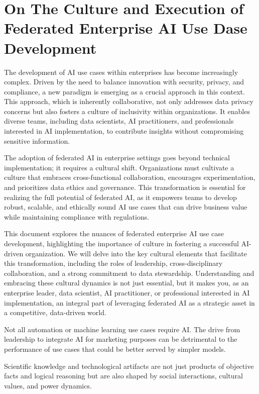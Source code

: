 \section{On The Culture and Execution of Federated Enterprise AI Use
Dase
Development}\label{on-the-culture-and-execution-of-federated-enterprise-ai-use-dase-development}

The development of AI use cases within enterprises has become
increasingly complex. Driven by the need to balance innovation with
security, privacy, and compliance, a new paradigm is emerging as a
crucial approach in this context. This approach, which is inherently
collaborative, not only addresses data privacy concerns but also fosters
a culture of inclusivity within organizations. It enables diverse teams,
including data scientists, AI practitioners, and professionals
interested in AI implementation, to contribute insights without
compromising sensitive information.

The adoption of federated AI in enterprise settings goes beyond
technical implementation; it requires a cultural shift. Organizations
must cultivate a culture that embraces cross-functional collaboration,
encourages experimentation, and prioritizes data ethics and governance.
This transformation is essential for realizing the full potential of
federated AI, as it empowers teams to develop robust, scalable, and
ethically sound AI use cases that can drive business value while
maintaining compliance with regulations.

This document explores the nuances of federated enterprise AI use case
development, highlighting the importance of culture in fostering a
successful AI-driven organization. We will delve into the key cultural
elements that facilitate this transformation, including the roles of
leadership, cross-disciplinary collaboration, and a strong commitment to
data stewardship. Understanding and embracing these cultural dynamics is
not just essential, but it makes you, as an enterprise leader, data
scientist, AI practitioner, or professional interested in AI
implementation, an integral part of leveraging federated AI as a
strategic asset in a competitive, data-driven world.

Not all automation or machine learning use cases require AI. The drive
from leadership to integrate AI for marketing purposes can be
detrimental to the performance of use cases that could be better served
by simpler models.

Scientific knowledge and technological artifacts are not just products
of objective facts and logical reasoning but are also shaped by social
interactions, cultural values, and power dynamics.

